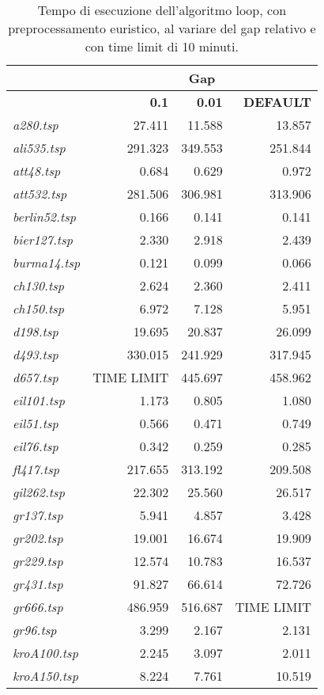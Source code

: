 {\footnotesize
\begin{longtable}[H]{lrrr}
\caption{Tempo di esecuzione dell'algoritmo loop, con preprocessamento euristico, al variare del gap relativo e con time limit di 10 minuti.}\\
\cline{2-4}
{} & \multicolumn{3}{c}{\textbf{Gap}}\\
\hline
{} & \textbf{0.1} & \textbf{0.01} & \textbf{DEFAULT}\\
\hline
\textit{a280.tsp} & 27.411 & 11.588 & 13.857\\
\textit{ali535.tsp} & 291.323 & 349.553 & 251.844\\
\textit{att48.tsp} & 0.684 & 0.629 & 0.972\\
\textit{att532.tsp} & 281.506 & 306.981 & 313.906\\
\textit{berlin52.tsp} & 0.166 & 0.141 & 0.141\\
\textit{bier127.tsp} & 2.330 & 2.918 & 2.439\\
\textit{burma14.tsp} & 0.121 & 0.099 & 0.066\\
\textit{ch130.tsp} & 2.624 & 2.360 & 2.411\\
\textit{ch150.tsp} & 6.972 & 7.128 & 5.951\\
\textit{d198.tsp} & 19.695 & 20.837 & 26.099\\
\textit{d493.tsp} & 330.015 & 241.929 & 317.945\\
\textit{d657.tsp} & TIME LIMIT & 445.697 & 458.962\\
\textit{eil101.tsp} & 1.173 & 0.805 & 1.080\\
\textit{eil51.tsp} & 0.566 & 0.471 & 0.749\\
\textit{eil76.tsp} & 0.342 & 0.259 & 0.285\\
\textit{fl417.tsp} & 217.655 & 313.192 & 209.508\\
\textit{gil262.tsp} & 22.302 & 25.560 & 26.517\\
\textit{gr137.tsp} & 5.941 & 4.857 & 3.428\\
\textit{gr202.tsp} & 19.001 & 16.674 & 19.909\\
\textit{gr229.tsp} & 12.574 & 10.783 & 16.537\\
\textit{gr431.tsp} & 91.827 & 66.614 & 72.726\\
\textit{gr666.tsp} & 486.959 & 516.687 & TIME LIMIT\\
\textit{gr96.tsp} & 3.299 & 2.167 & 2.131\\
\textit{kroA100.tsp} & 2.245 & 3.097 & 2.011\\
\textit{kroA150.tsp} & 8.224 & 7.761 & 10.519\\

\end{longtable}}
